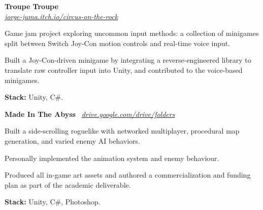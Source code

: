 \vspace{0.2 cm}

\begin{onecolentry}
\textbf{Troupe Troupe} \\
\textit{\href{https://jorge-juma.itch.io/circus-on-the-rock}{jorge-juma.itch.io/circus-on-the-rock}}
\end{onecolentry}

\vspace{0.20 cm}
\begin{onecolentry}
\begin{highlights}
\item Game jam project exploring uncommon input methods: a collection of minigames split between Switch Joy-Con motion controls and real-time voice input.
\item Built a Joy-Con-driven minigame by integrating a reverse-engineered library to translate raw controller input into Unity, and contributed to the voice-based minigames.
\item \textbf{Stack:} Unity, C\#.
\end{highlights}
\end{onecolentry}

\vspace{0.2 cm}

\begin{onecolentry}
\textbf{Made In The Abyss} \
\textit{\href{https://drive.google.com/drive/folders/1yEjoHvc1qDIjDSd7rOD395CgNGLbrMai?usp=drive_link}{drive.google.com/drive/folders}}

\end{onecolentry}

\vspace{0.20 cm}
\begin{onecolentry}
\begin{highlights}
\item Built a side-scrolling roguelike with networked multiplayer, procedural map generation, and varied enemy AI behaviors.
\item Personally implemented the animation system and enemy behaviour.
\item Produced all in-game art assets and authored a commercialization and funding plan as part of the academic deliverable.
\item \textbf{Stack:} Unity, C\#, Photoshop.
\end{highlights}
\end{onecolentry}

\vspace{0.2 cm}

